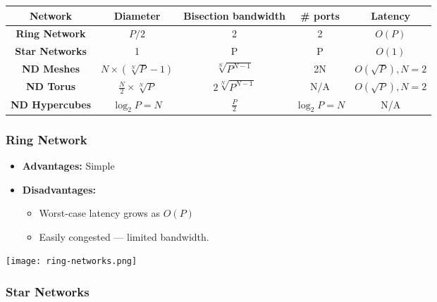 \documentclass[../main.tex]{subfiles}
\begin{document}
\begin{center}
	\begin{tabular}{| c | c | c | c | c |}
		\hline
		\textbf{Network}       & \textbf{Diameter}                  & \textbf{Bisection bandwidth} & \textbf{\# ports} & \textbf{Latency}    \\
		\hline
		\hline
		\textbf{Ring Network}  & \(P/2\)                            & 2                            & 2                 & \(O(P)\)            \\
		\hline
		\textbf{Star Networks} & 1                                  & P                            & P                 & \(O(1)\)            \\
		\hline
		\textbf{ND Meshes}     & \(N \times (\sqrt[N]{P} - 1)\)     & \(\sqrt[N]{P^{N-1}}\)        & 2N                & \(O(\sqrt{P}),N=2\) \\
		\hline
		\textbf{ND Torus}      & \(\frac{N}{2} \times \sqrt[N]{P}\) & \(2\sqrt[N]{P^{N-1}}\)       & N/A               & \(O(\sqrt{P}),N=2\) \\
		\hline
		\textbf{ND Hypercubes} & \(\log_2{P} = N\)                  & \(\frac{P}{2}\)              & \(\log_2{P} = N\) & N/A                 \\
		\hline
	\end{tabular}
\end{center}

\subsubsection{Ring Network}

\begin{multicols}{2}
	\begin{itemize}
		\item \textbf{Advantages:} Simple
		\item \textbf{Disadvantages:}
		\begin{itemize}
		    \item Worst-case latency grows as \(O(P)\)
		    \item Easily congested --- limited bandwidth.
		\end{itemize} 
	\end{itemize}

	\begin{center}
		\texttt{[image: ring-networks.png]}
	\end{center}
\end{multicols}

\subsubsection{Star Networks}
\end{document}
